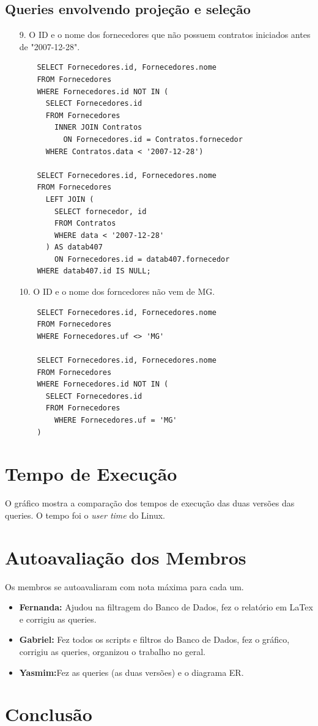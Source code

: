\documentclass{article}
\begin{document}
\subsection{Queries envolvendo projeção e seleção}
\begin{itemize}
\item[9.] O ID e o nome dos fornecedores que não possuem contratos iniciados antes de "2007-12-28".
  \begin{verbatim}
    SELECT Fornecedores.id, Fornecedores.nome
    FROM Fornecedores
    WHERE Fornecedores.id NOT IN (
      SELECT Fornecedores.id
      FROM Fornecedores
        INNER JOIN Contratos
          ON Fornecedores.id = Contratos.fornecedor
      WHERE Contratos.data < '2007-12-28')
      
    SELECT Fornecedores.id, Fornecedores.nome
    FROM Fornecedores
      LEFT JOIN (
        SELECT fornecedor, id
        FROM Contratos
        WHERE data < '2007-12-28'
      ) AS datab407
        ON Fornecedores.id = datab407.fornecedor 
    WHERE datab407.id IS NULL;
    \end{verbatim}
\item[10.] O ID e o nome dos forncedores não vem de MG.
  \begin{verbatim}
    SELECT Fornecedores.id, Fornecedores.nome
    FROM Fornecedores
    WHERE Fornecedores.uf <> 'MG'

    SELECT Fornecedores.id, Fornecedores.nome
    FROM Fornecedores
    WHERE Fornecedores.id NOT IN (
      SELECT Fornecedores.id
      FROM Fornecedores
	    WHERE Fornecedores.uf = 'MG'
    )

    \end{verbatim}
\end{itemize}

\section{Tempo de Execução}
O gráfico mostra a comparação dos tempos de execução das duas versões das queries.
O tempo foi o \textit{user time} do Linux.
\begin{figure}[H]
  \begin{center}  
        
  \end{center}  
  \label{fig:graph}
\end{figure}

\section{Autoavaliação dos Membros}
Os membros se autoavaliaram com nota máxima para cada um.
\begin{itemize}
\item \textbf{Fernanda:} Ajudou na filtragem do Banco de Dados, fez o relatório em LaTex e corrigiu as queries.
\item \textbf{Gabriel:} Fez todos os scripts e filtros do Banco de Dados, fez o gráfico, corrigiu as queries, organizou o trabalho no geral.
\item \textbf{Yasmim:}Fez as queries (as duas versões) e o diagrama ER.  
\end{itemize}
\section{Conclusão}



\end{document}

